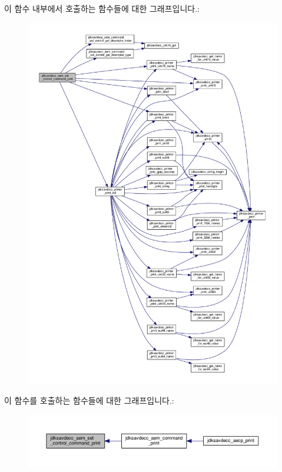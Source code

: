 이 함수 내부에서 호출하는 함수들에 대한 그래프입니다.\+:
\nopagebreak
\begin{figure}[H]
\begin{center}
\leavevmode
\includegraphics[width=350pt]{group__aem__print_gad7ab8c1f00ab43eef7206ee43adb8d48_cgraph}
\end{center}
\end{figure}




이 함수를 호출하는 함수들에 대한 그래프입니다.\+:
\nopagebreak
\begin{figure}[H]
\begin{center}
\leavevmode
\includegraphics[width=350pt]{group__aem__print_gad7ab8c1f00ab43eef7206ee43adb8d48_icgraph}
\end{center}
\end{figure}


